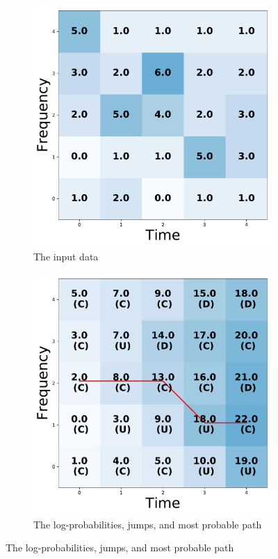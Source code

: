 \begin{figure}
\centering
\begin{subfigure}[h]{0.7\columnwidth}
\includegraphics[width=0.8\columnwidth]{C3_soap/vit_data.pdf}
\caption{The input data}
\label{soap:plot:data}
\end{subfigure}

\begin{subfigure}[h]{0.7\columnwidth}
\includegraphics[width=0.8\columnwidth]{C3_soap/vit_prob.pdf}
\caption{The log-probabilities, jumps, and most probable path}
\label{soap:plot:likelihood}
\end{subfigure}


\end{figure}
